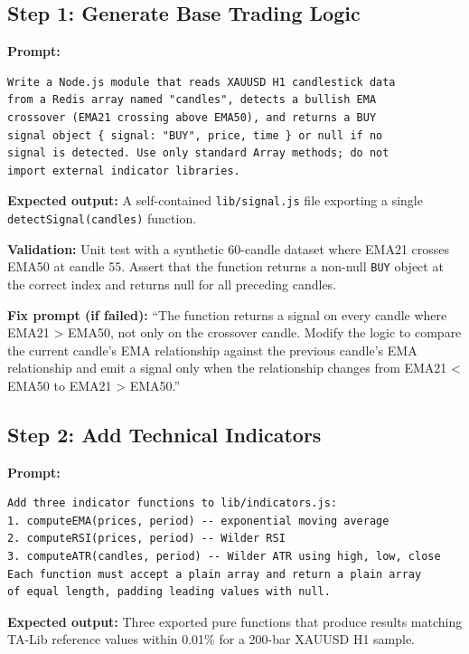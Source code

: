 \documentclass[conference]{IEEEtran}
\begin{document}
\subsection{Step 1: Generate Base Trading Logic}

\textbf{Prompt:}
\begin{lstlisting}
Write a Node.js module that reads XAUUSD H1 candlestick data
from a Redis array named "candles", detects a bullish EMA
crossover (EMA21 crossing above EMA50), and returns a BUY
signal object { signal: "BUY", price, time } or null if no
signal is detected. Use only standard Array methods; do not
import external indicator libraries.
\end{lstlisting}

\textbf{Expected output:} A self-contained \texttt{lib/signal.js}
file exporting a single \texttt{detectSignal(candles)} function.

\textbf{Validation:} Unit test with a synthetic 60-candle dataset
where EMA21 crosses EMA50 at candle 55.  Assert that the function
returns a non-null \texttt{BUY} object at the correct index and
returns null for all preceding candles.

\textbf{Fix prompt (if failed):} ``The function returns a signal on
every candle where EMA21 \textgreater{} EMA50, not only on the
crossover candle.  Modify the logic to compare the current candle's
EMA relationship against the previous candle's EMA relationship and
emit a signal only when the relationship changes from EMA21
\textless{} EMA50 to EMA21 \textgreater{} EMA50.''

\subsection{Step 2: Add Technical Indicators}

\textbf{Prompt:}
\begin{lstlisting}
Add three indicator functions to lib/indicators.js:
1. computeEMA(prices, period) -- exponential moving average
2. computeRSI(prices, period) -- Wilder RSI
3. computeATR(candles, period) -- Wilder ATR using high, low, close
Each function must accept a plain array and return a plain array
of equal length, padding leading values with null.
\end{lstlisting}

\textbf{Expected output:} Three exported pure functions that produce
results matching TA-Lib reference values within 0.01\% for a 200-bar
XAUUSD H1 sample.
\end{document}
